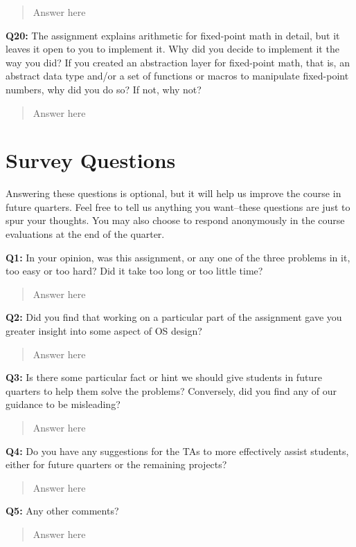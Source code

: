\documentclass[a4paper,11pt]{paper}
\begin{document}
\begin{quote}
  Answer here
\end{quote}

\textbf{Q20:} The assignment explains arithmetic for fixed-point math in detail,
but it leaves it open to you to implement it.  Why did you decide to implement
it the way you did?  If you created an abstraction layer for fixed-point math,
that is, an abstract data type and/or a set of functions or macros to manipulate
fixed-point numbers, why did you do so?  If not, why not?

\begin{quote}
  Answer here
\end{quote}

\section{Survey Questions}

Answering these questions is optional, but it will help us improve the course in future quarters.  Feel free to tell us anything you want--these questions are just to spur your thoughts.  You may also choose to respond anonymously in the course evaluations at the end of the quarter.

\textbf{Q1:} In your opinion, was this assignment, or any one of the three
problems in it, too easy or too hard?  Did it take too long or too little time?

\begin{quote}
  Answer here
\end{quote}

\textbf{Q2:} Did you find that working on a particular part of the assignment
gave you greater insight into some aspect of OS design?

\begin{quote}
  Answer here
\end{quote}

\textbf{Q3:} Is there some particular fact or hint we should give students in
future quarters to help them solve the problems?  Conversely, did you find any
of our guidance to be misleading?

\begin{quote}
  Answer here
\end{quote}

\textbf{Q4:} Do you have any suggestions for the TAs to more effectively assist
students, either for future quarters or the remaining projects?

\begin{quote}
  Answer here
\end{quote}

\textbf{Q5:} Any other comments?

\begin{quote}
  Answer here
\end{quote}
\end{document}
